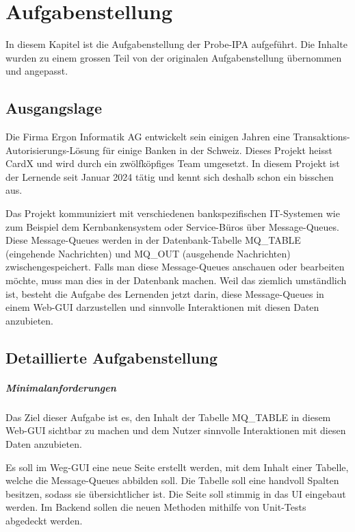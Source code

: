 \chapter{Aufgabenstellung}\label{ch:aufgabenstellung}
In diesem Kapitel ist die Aufgabenstellung der Probe-IPA aufgeführt. Die Inhalte wurden zu einem grossen Teil von der originalen Aufgabenstellung übernommen und angepasst.

\section{Ausgangslage}\label{sec:ausgangslage}
Die Firma \gls{Ergon Informatik AG} entwickelt sein einigen Jahren eine Transaktions-Autorisierungs-Lösung für einige Banken in der Schweiz. Dieses Projekt heisst \gls{CardX} und wird durch ein zwölfköpfiges Team umgesetzt. In diesem Projekt ist der Lernende seit Januar 2024 tätig und kennt sich deshalb schon ein bisschen aus.

Das Projekt kommuniziert mit verschiedenen bankspezifischen IT-Systemen wie zum Beispiel dem Kernbankensystem oder Service-Büros über Message-Queues. Diese Message-Queues werden in der Datenbank-Tabelle MQ\_TABLE (eingehende Nachrichten) und MQ\_OUT (ausgehende Nachrichten) zwischengespeichert. Falls man diese Message-Queues anschauen oder bearbeiten möchte, muss man dies in der Datenbank machen. Weil das ziemlich umständlich ist, besteht die Aufgabe des Lernenden jetzt darin, diese Message-Queues in einem \gls{Web-GUI} darzustellen und sinnvolle Interaktionen mit diesen Daten anzubieten.

\section{Detaillierte Aufgabenstellung}\label{sec:detaillierte-aufgabenstellung}

\paragraph{Minimalanforderungen}
Das Ziel dieser Aufgabe ist es, den Inhalt der Tabelle MQ\_TABLE in diesem Web-GUI sichtbar zu machen und dem Nutzer sinnvolle Interaktionen mit diesen Daten anzubieten.

Es soll im Weg-GUI eine neue Seite erstellt werden, mit dem Inhalt einer Tabelle, welche die Message-Queues abbilden soll. Die Tabelle soll eine handvoll Spalten besitzen, sodass sie übersichtlicher ist. Die Seite soll stimmig in das \gls{UI} eingebaut werden. Im Backend sollen die neuen Methoden mithilfe von Unit-Tests abgedeckt werden.

